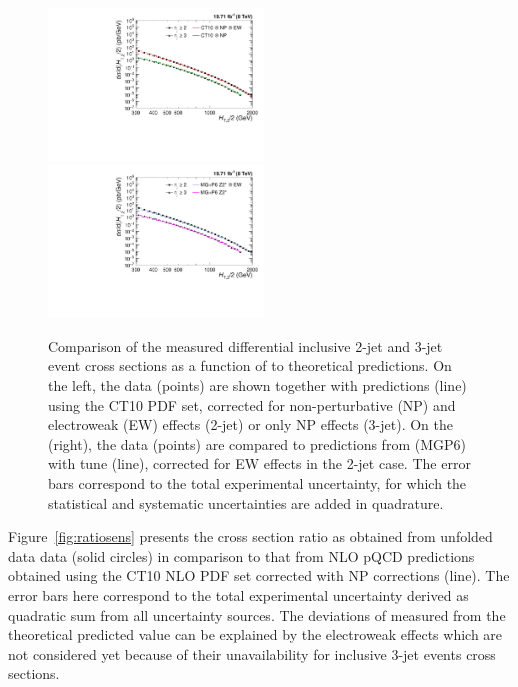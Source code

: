 \begin{figure}[!h]
 \hspace*{-5mm}\includegraphics[width=0.51\textwidth]{Plots_HT_2_150/Comparison_data_theory_EW.pdf}%
 ~~\includegraphics[width=0.51\textwidth]{Plots_HT_2_150/Comparison_data_MC_EW.pdf}\\
 \caption{Comparison of the measured differential inclusive 2-jet and 3-jet event cross sections as a function of \httwo to theoretical predictions. On the left, the data (points) are shown together with \NLOJETPP predictions (line) using the CT10 PDF set, corrected for non-perturbative (NP) and electroweak (EW) effects (2-jet) or only NP effects (3-jet). On the (right), the data (points) are compared to predictions from \MadGraphFn \plusn \PYTHIAS (MG\plusn P6) with tune \Ztwostar (line), corrected for EW effects in the 2-jet case. The error bars correspond to the total experimental uncertainty, for which the statistical and systematic uncertainties are added in quadrature.}
  \label{fig:data_NL0_MC}
\end{figure}

Figure~\ref{fig:ratiosens} presents the cross section ratio \ratio as obtained from unfolded data data (solid circles) in comparison to that from NLO pQCD predictions obtained using the CT10 NLO PDF set corrected with NP corrections (line). The error bars here correspond to the total experimental uncertainty derived as quadratic sum from all uncertainty sources. The deviations of measured \ratio from the theoretical predicted value can be explained by the electroweak effects which are not considered yet because of their unavailability for inclusive 3-jet events cross sections.

